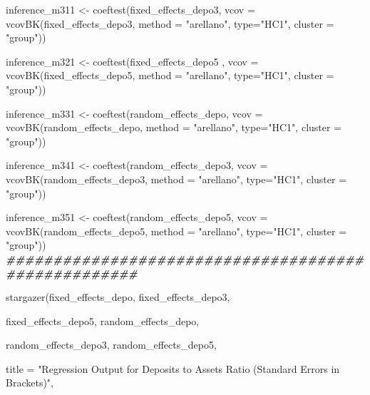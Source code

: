 \documentclass[a4paper,nobind]{templates/ociamthesis}
\newenvironment{Shaded}{\begin{snugshade}}{\end{snugshade}}
\newcommand{\AttributeTok}[1]{\textcolor[rgb]{0.77,0.63,0.00}{#1}}
\newcommand{\DocumentationTok}[1]{\textcolor[rgb]{0.56,0.35,0.01}{\textbf{\textit{#1}}}}
\newcommand{\FunctionTok}[1]{\textcolor[rgb]{0.00,0.00,0.00}{#1}}
\newcommand{\NormalTok}[1]{#1}
\newcommand{\OtherTok}[1]{\textcolor[rgb]{0.56,0.35,0.01}{#1}}
\newcommand{\StringTok}[1]{\textcolor[rgb]{0.31,0.60,0.02}{#1}}
\renewenvironment{Shaded}
{
  \vspace{10pt}%
  \begin{snugshade}%
}{%
  \end{snugshade}%
  \vspace{8pt}%
}
\begin{document}
\begin{landscape}
\begin{Shaded}
\begin{Highlighting}[]
\NormalTok{inference\_m311 }\OtherTok{\textless{}{-}} \FunctionTok{coeftest}\NormalTok{(fixed\_effects\_depo3, }\AttributeTok{vcov =} \FunctionTok{vcovBK}\NormalTok{(fixed\_effects\_depo3, }\AttributeTok{method =} \StringTok{"arellano"}\NormalTok{, }\AttributeTok{type=}\StringTok{"HC1"}\NormalTok{, }\AttributeTok{cluster =} \StringTok{"group"}\NormalTok{))}

\NormalTok{inference\_m321 }\OtherTok{\textless{}{-}} \FunctionTok{coeftest}\NormalTok{(fixed\_effects\_depo5 , }\AttributeTok{vcov =} \FunctionTok{vcovBK}\NormalTok{(fixed\_effects\_depo5, }\AttributeTok{method =} \StringTok{"arellano"}\NormalTok{, }\AttributeTok{type=}\StringTok{"HC1"}\NormalTok{, }\AttributeTok{cluster =} \StringTok{"group"}\NormalTok{))}

\NormalTok{inference\_m331 }\OtherTok{\textless{}{-}} \FunctionTok{coeftest}\NormalTok{(random\_effects\_depo, }\AttributeTok{vcov =} \FunctionTok{vcovBK}\NormalTok{(random\_effects\_depo, }\AttributeTok{method =} \StringTok{"arellano"}\NormalTok{, }\AttributeTok{type=}\StringTok{"HC1"}\NormalTok{, }\AttributeTok{cluster =} \StringTok{"group"}\NormalTok{))}

\NormalTok{inference\_m341 }\OtherTok{\textless{}{-}} \FunctionTok{coeftest}\NormalTok{(random\_effects\_depo3, }\AttributeTok{vcov =} \FunctionTok{vcovBK}\NormalTok{(random\_effects\_depo3, }\AttributeTok{method =} \StringTok{"arellano"}\NormalTok{, }\AttributeTok{type=}\StringTok{"HC1"}\NormalTok{, }\AttributeTok{cluster =} \StringTok{"group"}\NormalTok{))}

\NormalTok{inference\_m351 }\OtherTok{\textless{}{-}} \FunctionTok{coeftest}\NormalTok{(random\_effects\_depo5, }\AttributeTok{vcov =} \FunctionTok{vcovBK}\NormalTok{(random\_effects\_depo5, }\AttributeTok{method =} \StringTok{"arellano"}\NormalTok{, }\AttributeTok{type=}\StringTok{"HC1"}\NormalTok{, }\AttributeTok{cluster =} \StringTok{"group"}\NormalTok{))}
\DocumentationTok{\#\#\#\#\#\#\#\#\#\#\#\#\#\#\#\#\#\#\#\#\#\#\#\#\#\#\#\#\#\#\#\#\#\#\#\#\#\#\#\#\#\#\#\#\#\#\#\#\#\#\#\#}


\FunctionTok{stargazer}\NormalTok{(fixed\_effects\_depo, fixed\_effects\_depo3, }
          
\NormalTok{         fixed\_effects\_depo5, random\_effects\_depo, }
         
\NormalTok{         random\_effects\_depo3, random\_effects\_depo5,}
         
         \AttributeTok{title =} \StringTok{"Regression Output for Deposits to Assets Ratio (Standard Errors in Brackets)"}\NormalTok{, }
          

\end{Highlighting}
\end{Shaded}
\end{landscape}
\end{document}
